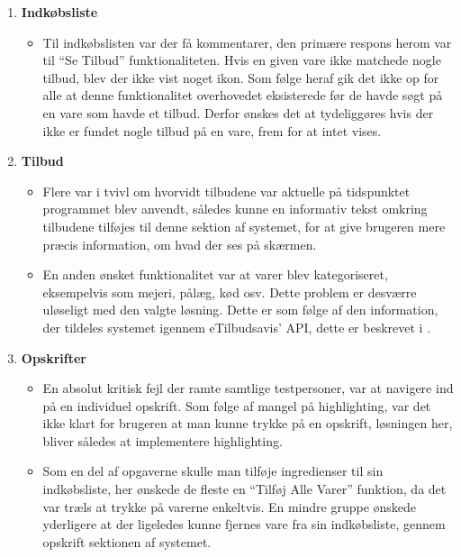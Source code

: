 \begin{enumerate}
   \item \textbf{Indkøbsliste} \begin{itemize}
   								  \item Til indkøbslisten var der få kommentarer, den primære respons herom var til ``Se Tilbud'' funktionaliteten. Hvis en given vare ikke matchede nogle tilbud, blev der ikke vist noget ikon. Som følge heraf gik det ikke op for alle at denne funktionalitet overhovedet eksisterede før de havde søgt på en vare som havde et tilbud. Derfor ønskes det at tydeliggøres hvis der ikke er fundet nogle tilbud på en vare, frem for at intet vises.
   							   \end{itemize}
   \item \textbf{Tilbud}\begin{itemize}
   								  \item Flere var i tvivl om hvorvidt tilbudene var aktuelle på tidspunktet programmet blev anvendt, således kunne en informativ tekst omkring tilbudene tilføjes til denne sektion af systemet, for at give brugeren mere præcis information, om hvad der ses på skærmen.
   								  
   								  \item En anden ønsket funktionalitet var at varer blev kategoriseret, eksempelvis som mejeri, pålæg, kød osv. Dette problem er desværre uløseligt med den valgte løsning.
   								  Dette er som følge af den information, der tildeles systemet igennem eTilbudsavis' API, dette er beskrevet i .
   							   \end{itemize}
   \item \textbf{Opskrifter}\begin{itemize}
   								  \item En absolut kritisk fejl der ramte samtlige testpersoner, var at navigere ind på en individuel opskrift. Som følge af mangel på highlighting, var det ikke klart for brugeren at man kunne trykke på en opskrift, løsningen her, bliver således at implementere highlighting.
   								  
   								  \item Som en del af opgaverne skulle man tilføje ingredienser til sin indkøbsliste, her ønskede de fleste en ``Tilføj Alle Varer'' funktion, da det var træls at trykke på varerne enkeltvis.
   								  En mindre gruppe ønskede yderligere at der ligeledes kunne fjernes vare fra sin indkøbsliste, gennem opskrift sektionen af systemet.
   								  

\end{itemize}
\end{enumerate}
